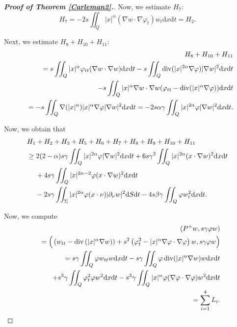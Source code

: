 \documentclass[11pt]{article}
\numberwithin{equation}{section}
\def\pt{\partial}
\def\vp{\varphi}
\def\bf{\textbf}
\def\pt{\partial}
\def\al{\alpha}
\def\be{\beta}
\def\ga{\gamma}
\def\df{\mathrm d}
\DeclareMathOperator{\Div}{div}
\begin{document}
\begin{proof}[{\rm \bf { Proof of  Theorem \ref{Carleman2}.}}]
			
			Now, we estimate $H_7$:
			\begin{equation*}
				H_7
				=-2s\iint_Q|x|^\al (\nabla w\cdot \nabla \vp_t)w_t\df x\df t=H_2.
			\end{equation*}
			
			Next, we estimate  $H_8+H_{10}+H_{11}$:
			\begin{eqnarray*}
				&&H_8+H_{10}+H_{11}\\
				&&=s\iint_Q|x|^\al \vp_{tt}(\nabla w\cdot \nabla w)\df x\df t -s\iint_Q\Div(|x|^{2\al}\nabla\vp)|\nabla w|^2\df x\df t\\
				&&\hspace{4.5mm}-s\iint_Q|x|^\al \nabla w\cdot \nabla w(\vp_{tt}-\Div(|x|^\al \nabla \vp))\df x\df t\\
				&&=-s\iint_Q \nabla (|x|^\al) |x|^\al \nabla \vp|\nabla w|^2\df x\df t=-2s \alpha\ga\iint_Q|x|^{2\al}\vp|\nabla w|^2\df x\df t.
			\end{eqnarray*}
			
			
			Now, we obtain that
			\begin{equation*}
				\begin{split}
					& H_1+H_2+H_3+H_5+H_6+H_7+H_8+H_9+H_{10}+H_{11}\\
					&\geq 2(2-\alpha)s\ga \iint_Q|x|^{2\al}\vp |\nabla w|^2\df x\df t+6s\ga^2\iint_Q|x|^{2\al}(x\cdot \nabla w)^2\df x\df t\\
					&\hspace{4.5mm}+4s\ga\iint_Q|x|^{2\al-2}\vp (x\cdot \nabla w)^2\df x\df t \\
					&\hspace{4.5mm}-2s\ga \iint_\Sigma |x|^{2\al}  \vp (x\cdot \nu)|\pt_\nu w|^2\df S\df t -4s\be\ga\iint_Q\vp w_t^2\df x\df t.
				\end{split}
			\end{equation*}
			
			
			Now, we compute
			\begin{eqnarray*}
				&&(P^+w, s\ga \vp w)\\
				&& =\Big(\left(w_{tt}-\Div\left(|x|^\al \nabla w\right)\right)+s^2\left(\vp_t^2-|x|^\al \nabla\vp\cdot \nabla\vp\right)w, s\ga \vp w\Big)\\
				&&=s\ga \iint_Q \vp w_{tt} w\df x\df t-s\ga \iint_Q \vp \Div(|x|^\al \nabla w)w\df x\df t\\
				&&\hspace{4.5mm} +s^3\ga \iint_Q \vp_t^2\vp w^2\df x\df t-s^3\ga \iint_Q |x|^\al \vp (\nabla\vp\cdot \nabla\vp) w^2\df x\df t\\
				&&=\sum_{i=1}^4L_i.
			\end{eqnarray*}
			

\end{proof}
\end{document}
